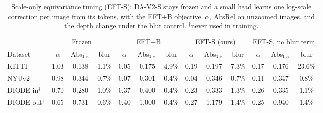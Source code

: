 \begin{table}[t]\centering\scriptsize
\caption{Scale-only equivariance tuning (EFT-S): DA-V2-S stays frozen and a small head learns one log-scale correction per image from its tokens, with the EFT+B objective. $\alpha$, AbsRel on unzoomed images, and the depth change under the blur control. $^\dagger$never used in training.}\label{tab:scale}
\setlength{\tabcolsep}{3pt}
\begin{tabular}{l ccc ccc ccc ccc}\toprule
& \multicolumn{3}{c}{Frozen} & \multicolumn{3}{c}{EFT+B} & \multicolumn{3}{c}{EFT-S (ours)} & \multicolumn{3}{c}{EFT-S, no blur term} \\
\cmidrule(lr){2-4}\cmidrule(lr){5-7}\cmidrule(lr){8-10}\cmidrule(lr){11-13}
Dataset & $\alpha$ & Abs$_{1\times}$ & blur & $\alpha$ & Abs$_{1\times}$ & blur & $\alpha$ & Abs$_{1\times}$ & blur & $\alpha$ & Abs$_{1\times}$ & blur \\ \midrule
KITTI & 1.03 & 0.138 & 1.1\% & 0.05 & 0.175 & 4.9\% & 0.19 & 0.197 & 7.3\% & 0.17 & 0.176 & 23.6\% \\
NYUv2 & 0.98 & 0.344 & 0.7\% & 0.07 & 0.301 & 0.4\% & 0.04 & 0.346 & 0.7\% & 0.11 & 0.347 & 0.8\% \\
DIODE-in$^\dagger$ & 0.70 & 0.280 & 1.0\% & 0.37 & 0.400 & 0.4\% & 0.23 & 0.333 & 1.3\% & 0.26 & 0.335 & 1.1\% \\
DIODE-out$^\dagger$ & 0.65 & 0.731 & 0.6\% & 0.40 & 1.000 & 0.4\% & 0.27 & 1.179 & 1.4\% & 0.25 & 0.940 & 1.4\% \\
\bottomrule\end{tabular}\end{table}
